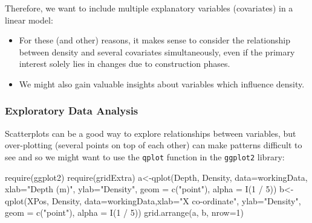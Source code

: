 \documentclass[
  oneside]{krantz}
\newenvironment{Shaded}{\begin{snugshade}}{\end{snugshade}}
\newcommand{\AttributeTok}[1]{\textcolor[rgb]{0.77,0.63,0.00}{#1}}
\newcommand{\DecValTok}[1]{\textcolor[rgb]{0.00,0.00,0.81}{#1}}
\newcommand{\FunctionTok}[1]{\textcolor[rgb]{0.00,0.00,0.00}{#1}}
\newcommand{\NormalTok}[1]{#1}
\newcommand{\OtherTok}[1]{\textcolor[rgb]{0.56,0.35,0.01}{#1}}
\newcommand{\SpecialCharTok}[1]{\textcolor[rgb]{0.00,0.00,0.00}{#1}}
\newcommand{\StringTok}[1]{\textcolor[rgb]{0.31,0.60,0.02}{#1}}
\begin{document}
Therefore, we want to include multiple explanatory variables (covariates) in a linear model:

\begin{itemize}
\item
  For these (and other) reasons, it makes sense to consider the relationship between density and several covariates simultaneously, even if the primary interest solely lies in changes due to construction phases.
\item
  We might also gain valuable insights about variables which influence density.
\end{itemize}

\hypertarget{exploratory-data-analysis-1}{%
\subsubsection{Exploratory Data Analysis}\label{exploratory-data-analysis-1}}

Scatterplots can be a good way to explore relationships between variables, but over-plotting (several points on top of each other) can make patterns difficult to see and so we might want to use the \texttt{qplot} function in the \texttt{ggplot2} library:

\begin{Shaded}
\begin{Highlighting}[]
\FunctionTok{require}\NormalTok{(ggplot2)}
\FunctionTok{require}\NormalTok{(gridExtra)}
\NormalTok{a}\OtherTok{\textless{}{-}}\FunctionTok{qplot}\NormalTok{(Depth, Density, }\AttributeTok{data=}\NormalTok{workingData, }\AttributeTok{xlab=}\StringTok{"Depth (m)"}\NormalTok{,}
\AttributeTok{ylab=}\StringTok{"Density"}\NormalTok{, }\AttributeTok{geom =} \FunctionTok{c}\NormalTok{(}\StringTok{"point"}\NormalTok{), }\AttributeTok{alpha =} \FunctionTok{I}\NormalTok{(}\DecValTok{1} \SpecialCharTok{/} \DecValTok{5}\NormalTok{))}
\NormalTok{b}\OtherTok{\textless{}{-}}\FunctionTok{qplot}\NormalTok{(XPos, Density, }\AttributeTok{data=}\NormalTok{workingData,}\AttributeTok{xlab=}\StringTok{"X co{-}ordinate"}\NormalTok{,}
\AttributeTok{ylab=}\StringTok{"Density"}\NormalTok{, }\AttributeTok{geom =} \FunctionTok{c}\NormalTok{(}\StringTok{"point"}\NormalTok{), }\AttributeTok{alpha =} \FunctionTok{I}\NormalTok{(}\DecValTok{1} \SpecialCharTok{/} \DecValTok{5}\NormalTok{))}
\FunctionTok{grid.arrange}\NormalTok{(a, b, }\AttributeTok{nrow=}\DecValTok{1}\NormalTok{)}
\end{Highlighting}
\end{Shaded}
\end{document}
